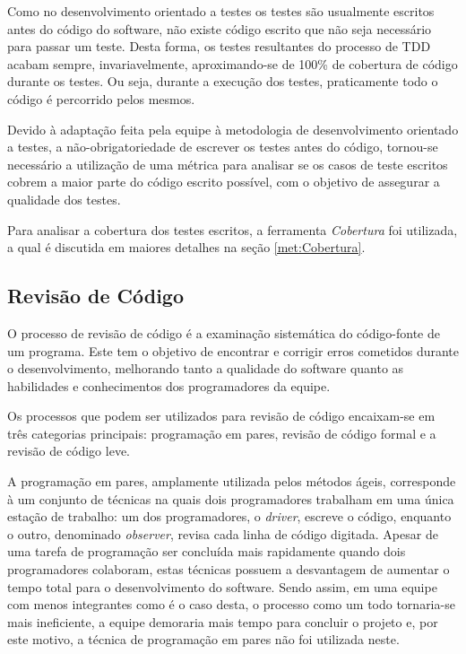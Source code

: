Como no desenvolvimento orientado a testes os testes são usualmente escritos antes do código do software, não existe código escrito que não seja necessário para passar um teste.
Desta forma, os testes resultantes do processo de TDD acabam sempre, invariavelmente, aproximando-se de 100\% de cobertura de código durante os testes.
Ou seja, durante a execução dos testes, praticamente todo o código é percorrido pelos mesmos.

Devido à adaptação feita pela equipe à metodologia de desenvolvimento orientado a testes, a não-obrigatoriedade de escrever os testes antes do código, tornou-se necessário a utilização de uma métrica para analisar se os casos de teste escritos cobrem a maior parte do código escrito possível, com o objetivo de assegurar a qualidade dos testes.

Para analisar a cobertura dos testes escritos, a ferramenta \emph{Cobertura} foi utilizada, a qual é discutida em maiores detalhes na seção \ref{met:Cobertura}.


\subsection{Revisão de Código}


O processo de revisão de código é a examinação sistemática do código-fonte de um programa.
Este tem o objetivo de encontrar e corrigir erros cometidos durante o desenvolvimento, melhorando tanto a qualidade do software quanto as habilidades e conhecimentos dos programadores da equipe.

Os processos que podem ser utilizados para revisão de código encaixam-se em três categorias principais: programação em pares, revisão de código formal e a revisão de código leve.

A programação em pares, amplamente utilizada pelos métodos ágeis, corresponde à um conjunto de técnicas na quais dois programadores trabalham em uma única estação de trabalho: um dos programadores, o \emph{driver}, escreve o código, enquanto o outro, denominado \emph{observer}, revisa cada linha de código digitada.
Apesar de uma tarefa de programação ser concluída mais rapidamente quando dois programadores colaboram, estas técnicas possuem a desvantagem de aumentar o tempo total para o desenvolvimento do software. %
Sendo assim, em uma equipe com menos integrantes como é o caso desta, o processo como um todo tornaria-se mais ineficiente, a equipe demoraria mais tempo para concluir o projeto e, por este motivo, a técnica de programação em pares não foi utilizada neste.

